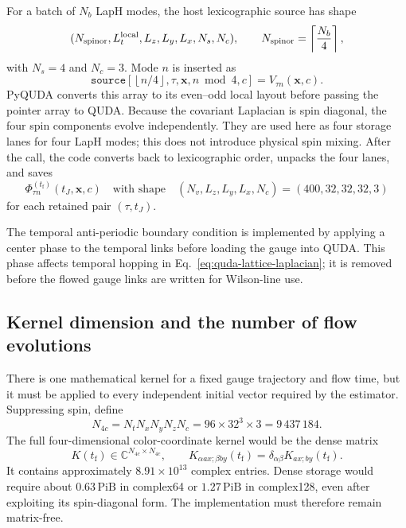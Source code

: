 \documentclass[11pt]{article}
\numberwithin{equation}{section}
\newcommand{\tf}{t_{\mathrm f}}
\begin{document}
For a batch of \(N_b\) LapH modes, the host lexicographic source has shape
\begin{equation}
  (N_{\rm spinor},L_t^{\rm local},L_z,L_y,L_x,N_s,N_c),
  \qquad
  N_{\rm spinor}=\left\lceil\frac{N_b}{4}\right\rceil,
  \label{eq:gflow-host-layout}
\end{equation}
with \(N_s=4\) and \(N_c=3\).  Mode \(n\) is inserted as
\begin{equation}
  \texttt{source}
  \left[\left\lfloor n/4\right\rfloor,
        \tau,\bm x,n\bmod4,c\right]
  =V_{\tau n}(\bm x,c).
  \label{eq:gflow-mode-pack}
\end{equation}
PyQUDA converts this array to its even--odd local layout before passing the
pointer array to QUDA.  Because the covariant Laplacian is spin diagonal, the
four spin components evolve independently.  They are used here as four
storage lanes for four LapH modes; this does not introduce physical spin
mixing.  After the call, the code converts back to lexicographic order,
unpacks the four lanes, and saves
\begin{equation}
  \Phi_{\tau n}^{(\tf)}(t_J,\bm x,c)
  \quad\text{with shape}\quad
  (N_v,L_z,L_y,L_x,N_c)=(400,32,32,32,3)
  \label{eq:gflow-saved-basis-shape}
\end{equation}
for each retained pair \((\tau,t_J)\).

The temporal anti-periodic boundary condition is implemented by applying a
center phase to the temporal links before loading the gauge into QUDA.  This
phase affects temporal hopping in Eq.~\eqref{eq:quda-lattice-laplacian}; it is
removed before the flowed gauge links are written for Wilson-line use.

\subsection{Kernel dimension and the number of flow evolutions}

There is one mathematical kernel for a fixed gauge trajectory and flow time,
but it must be applied to every independent initial vector required by the
estimator.  Suppressing spin, define
\begin{equation}
  N_{4c}=N_tN_xN_yN_zN_c
  =96\times32^3\times3
  =9\,437\,184.
\end{equation}
The full four-dimensional color-coordinate kernel would be the dense matrix
\begin{equation}
  K(\tf)\in\mathbb C^{N_{4c}\times N_{4c}},
  \qquad
  K_{\alpha a x;\beta b y}(\tf)
  =\delta_{\alpha\beta}K_{a x;b y}(\tf).
  \label{eq:full-kernel-dimension}
\end{equation}
It contains approximately \(8.91\times10^{13}\) complex entries.  Dense
storage would require about \(0.63\,\mathrm{PiB}\) in complex64 or
\(1.27\,\mathrm{PiB}\) in complex128, even after exploiting its spin-diagonal
form.  The implementation must therefore remain matrix-free.
\end{document}
